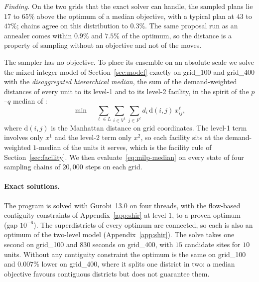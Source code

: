 \documentclass[11pt]{article}
\theoremstyle{definition}
\begin{document}
\emph{Finding.} On the two grids that the exact solver can handle, the sampled plans lie $17$ to $65\%$ above the optimum of a median objective, with a typical plan at $43$ to $47\%$; chains agree on this distribution to $0.3\%$. The same proposal run as an annealer comes within $0.9\%$ and $7.5\%$ of the optimum, so the distance is a property of sampling without an objective and not of the moves.

The sampler has no objective. To place its ensemble on an absolute scale we solve the mixed-integer model of Section~\ref{sec:model} exactly on grid\_100 and grid\_400 with the \emph{disaggregated hierarchical median}, the sum of the demand-weighted distances of every unit to its level-1 and to its level-2 facility, in the spirit of the $p$--$q$ median of \citet{serra1993pq}:
\begin{equation}\label{eq:milp-median}
  \min \quad \sum_{\ell \in L} \sum_{i \in V^1} \sum_{j \in F^\ell} d_i \, \mathrm{d}(i, j) \, x^\ell_{ij},
\end{equation}
where $\mathrm{d}(i,j)$ is the Manhattan distance on grid coordinates. The level-1 term involves only $x^1$ and the level-2 term only $x^2$, so each facility sits at the demand-weighted $1$-median of the units it serves, which is the facility rule of Section~\ref{sec:facility}. We then evaluate~\eqref{eq:milp-median} on every state of four sampling chains of $20{,}000$ steps on each grid.

\paragraph{Exact solutions.}
The program is solved with Gurobi~13.0 on four threads, with the flow-based contiguity constraints of Appendix~\ref{app:shir} at level $1$, to a proven optimum (gap $10^{-6}$). The superdistricts of every optimum are connected, so each is also an optimum of the two-level model (Appendix~\ref{app:shir}). The solve takes one second on grid\_100 and $830$ seconds on grid\_400, with $15$ candidate sites for $10$ units. Without any contiguity constraint the optimum is the same on grid\_100 and $0.007\%$ lower on grid\_400, where it splits one district in two: a median objective favours contiguous districts but does not guarantee them.

\begin{table}[!htbp]
\centering
\small

\caption{The sampled ensemble against the exact optimum of objective~\eqref{eq:milp-median}. The ensemble columns are quantiles of the objective over the post-burn-in states of four chains of $20{,}000$ steps, relative to the optimum. ``Annealed'' is the best state of eight annealing runs of $10{,}000$ steps with the same proposal.}
\label{tab:milp}
\end{table}
\end{document}
